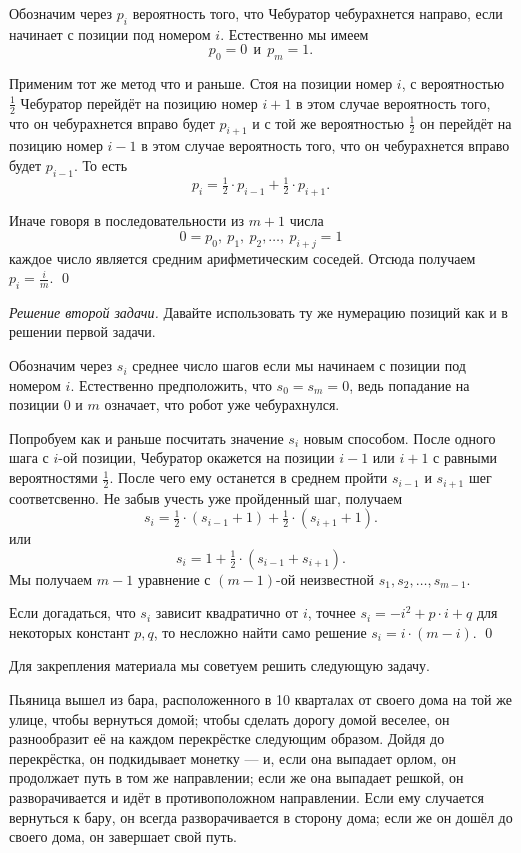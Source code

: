 \documentclass{article}
\begin{document}
Обозначим через $p_i$ вероятность того, 
что Чебуратор чебурахнется направо,
если начинает с позиции под номером $i$.
Естественно мы имеем 
\[p_0=0\ \  \text{и}\ \  p_{m}=1.\]

Применим тот же метод что и раньше.
Стоя на позиции номер $i$,
с вероятностью $\tfrac12$ Чебуратор перейдёт на позицию номер $i+1$
в этом случае вероятность того, 
что он чебурахнется вправо будет $p_{i+1}$
и с той же вероятностью $\tfrac12$ он перейдёт на позицию номер $i-1$
в этом случае вероятность того, что он чебурахнется вправо будет $p_{i-1}$.
То есть 
\[p_i=\tfrac12\cdot p_{i-1}+\tfrac12\cdot p_{i+1}.\]

Иначе говоря в последовательности из $m+1$ числа
\[0=p_0,\ p_1,\ p_2,\dots,\ p_{i+j}=1\] 
каждое число является средним арифметическим 
соседей.
Отсюда получаем $p_i=\tfrac im$.
\qed

\medskip
\noindent\textit{Решение второй задачи.}
Давайте использовать ту же нумерацию позиций как и в решении первой задачи.

Обозначим через $s_i$ среднее число шагов если мы начинаем с позиции под номером $i$.
Естественно предположить, что $s_0=s_{m}=0$,
ведь попадание на позиции $0$ и $m$ означает, что робот уже чебурахнулся.

Попробуем как и раньше посчитать значение $s_i$ новым способом.
После одного шага с $i$-ой позиции,
Чебуратор окажется на позиции $i-1$ или $i+1$ с равными вероятностями $\tfrac12$.
После чего ему останется в среднем пройти $s_{i-1}$ и $s_{i+1}$ шег соответсвенно. 
Не забыв учесть уже пройденный шаг,
получаем
\[s_i=\tfrac12\cdot(s_{i-1}+1)+\tfrac12\cdot(s_{i+1}+1).\]
или 
\[s_i=1+\tfrac12\cdot(s_{i-1}+s_{i+1}).\]
Мы получаем $m-1$ уравнение с 
$(m-1)$-ой неизвестной
$s_1,s_2,\dots,s_{m-1}$.

Если догадаться,
что $s_i$ зависит квадратично от $i$,
точнее $s_i=-i^2+p\cdot i +q$ для некоторых констант $p,q$,
то несложно найти само решение
$s_i=i\cdot(m-i)$.
\qed
\medskip

Для закрепления материала мы советуем решить следующую задачу.

Пьяница вышел из бара, расположенного в 10 кварталах от своего дома на той же улице, чтобы вернуться домой; 
чтобы сделать дорогу домой веселее, он разнообразит её на каждом перекрёстке следующим образом. 
Дойдя до перекрёстка, он подкидывает монетку --- и, если она выпадает орлом, он продолжает путь в том же направлении; если же она выпадает решкой, он разворачивается и идёт в противоположном направлении. 
Если ему случается вернуться к бару, он всегда разворачивается в сторону дома; если же он дошёл до своего дома, он завершает свой путь. 
\end{document}
